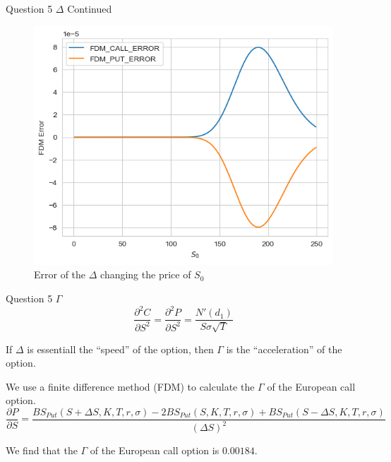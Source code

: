 \documentclass[compress,12pt]{beamer}
\begin{document}
\begin{frame}{Question 5 $\Delta$ Continued}
      \begin{figure}
            \centering
            \includegraphics[scale=0.6]{./imgs/deltaerror.png}
            \caption{Error of the $\Delta$ changing the price of $S_0$}
      \end{figure}
\end{frame}

\begin{frame}{Question 5 $\Gamma$}
      \begin{equation*}
            \frac{\partial ^2{C}}{\partial S^2} =\frac{\partial ^2{P}}{\partial S^2} = \frac{N'(d_1)}{S\sigma\sqrt{T}}
      \end{equation*}

      If $\Delta$ is essentiall the ``speed'' of the option, then $\Gamma$ is the ``acceleration'' of the option.

      We use a finite difference method (FDM) to calculate the $\Gamma$ of the European call option.
      \tiny{
      \begin{equation*}
            \frac{\partial P}{\partial S} = \frac{BS_{Put}(S+\Delta S, K, T,r,\sigma) - 2BS_{Put}(S,K, T,r,\sigma) +BS_{Put}(S-\Delta S, K, T,r,\sigma)}{(\Delta S)^2}
      \end{equation*}
      }

      \normalsize

      \begin{tcolorbox}
            We find that the $\Gamma$ of the European call option is $\boxed{0.00184}$.
      \end{tcolorbox}
\end{frame}
\end{document}
